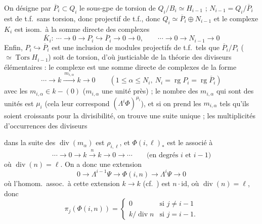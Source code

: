 \documentclass[11pt,a4paper]{article}
\begin{document}
On désigne par $\overline{P}_{i} \subset Q_{i}$ 
\ill{} le sous-gpe \ill{} de torsion de $Q_{i}/B_{i} \simeq H_{i-1}$ ;
$N_{i-1} = Q_{i}/\overline{P}_{i}$ est de t.f.\ sans torsion, donc
 projectif de t.f., donc $Q_{i} \simeq
\overline{P}_{i} \oplus N_{i-1}$ et le complexe $K_{i}$ est isom.\ à la
somme directe des complexes
\[
  \overline{K}_{i} : \ \cdots \to 0 \to P_{i} \hookrightarrow
  \overline{P}_{i} \to 0 \to 0, \qquad
  \cdots \to 0 \to N_{i-1} \to 0
\]
Enfin, $P_{i} \hookrightarrow \overline{P}_{i}$ est une inclusion de
modules projectifs de t.f.\ tels que $\overline{P}_{i}/P_{i}$ ($\simeq
\operatorname{Tors} H_{i-1}$) soit de torsion, d'où justiciable de la
théorie des diviseurs élémentaires  :
\struck{\ill{}} le complexe est une somme directe  de
complexes de la forme
\[
  \cdots \to k \xrightarrow{\ m_{i,\alpha}\ } k \to 0 \qquad
  (1 \leqslant \alpha \leqslant N_{i},\ N_{i} = \operatorname{rg} P_{i} =
  \operatorname{rg} \overline{P}_{i})
\]
avec les $m_{i,\alpha} \in k - (0)$ ($m_{i,\alpha}$ \struck{\ill{}}
 une unité \struck{\ill{}} près) ; le nombre des
$m_{i,\alpha}$ qui sont des unités est $\mu_{i}$ (cela leur correspond
$(\Lambda^{i}\Phi)^{\mu_{i}}$), et si on prend les $m_{i,\alpha}$ tels qu'ils
soient croissants pour la divisibilité, on trouve une suite unique ; les
multiplicités d'occurrences des diviseurs \ill{}

dans la suite des $\operatorname{div}(m_{\alpha})$ est $\rho_{i,\ell}$, et
$\Phi(i,\ell)_{*}$ est le  
associé à
\[
  \cdots \to 0 \to k \xrightarrow{\ n\ } k \to 0 \to \cdots \qquad
  \text{(en degrés $i$ et $i-1$)}
\]
où $\operatorname{div}(n) = \ell$. On a donc une extension
\[
  0 \to \Lambda^{i-1}\Psi \to \Phi(i,n) \to \Lambda^{i}\Psi \to 0
\]
où l'homom.\ assoc.\ à cette extension $k \to k$ (cf.\ \ill{}) est
$n \cdot \mathrm{id}$, où $\operatorname{div}(n) = \ell$, donc
\struck{\ill{}}
\[
  \pi_{j}(\Phi(i,n)) =
  \begin{cases}
    0 & \text{si } j \neq i-1 \\
    k/\operatorname{div} n & \text{si } j = i-1 .
  \end{cases}
\]
\end{document}
